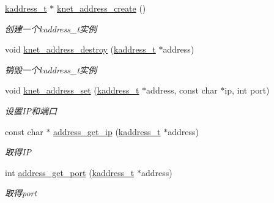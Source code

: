 \begin{DoxyCompactItemize}
\item 
\hyperlink{a00054_a44e99fab0348ec54cfee119ddd9ceed6_a44e99fab0348ec54cfee119ddd9ceed6}{kaddress\+\_\+t} $\ast$ \hyperlink{a00042_a1a1e0dffc03ea50995d5db10e17865f5_a1a1e0dffc03ea50995d5db10e17865f5}{knet\+\_\+address\+\_\+create} ()
\begin{DoxyCompactList}\small\item\em 创建一个kaddress\+\_\+t实例 \end{DoxyCompactList}\item 
void \hyperlink{a00042_a6d8753e0c57b30294243ee26881e7650_a6d8753e0c57b30294243ee26881e7650}{knet\+\_\+address\+\_\+destroy} (\hyperlink{a00054_a44e99fab0348ec54cfee119ddd9ceed6_a44e99fab0348ec54cfee119ddd9ceed6}{kaddress\+\_\+t} $\ast$address)
\begin{DoxyCompactList}\small\item\em 销毁一个kaddress\+\_\+t实例 \end{DoxyCompactList}\item 
void \hyperlink{a00042_a929d17892b34acdbdbc1ff8e8d0f9c71_a929d17892b34acdbdbc1ff8e8d0f9c71}{knet\+\_\+address\+\_\+set} (\hyperlink{a00054_a44e99fab0348ec54cfee119ddd9ceed6_a44e99fab0348ec54cfee119ddd9ceed6}{kaddress\+\_\+t} $\ast$address, const char $\ast$ip, int port)
\begin{DoxyCompactList}\small\item\em 设置\+I\+P和端口 \end{DoxyCompactList}\item 
const char $\ast$ \hyperlink{a00107_gaa1ea22192168bb6baea88feeb20eb601_gaa1ea22192168bb6baea88feeb20eb601}{address\+\_\+get\+\_\+ip} (\hyperlink{a00054_a44e99fab0348ec54cfee119ddd9ceed6_a44e99fab0348ec54cfee119ddd9ceed6}{kaddress\+\_\+t} $\ast$address)
\begin{DoxyCompactList}\small\item\em 取得\+I\+P \end{DoxyCompactList}\item 
int \hyperlink{a00107_ga9acaa00fe11bcecadea350baf9da7172_ga9acaa00fe11bcecadea350baf9da7172}{address\+\_\+get\+\_\+port} (\hyperlink{a00054_a44e99fab0348ec54cfee119ddd9ceed6_a44e99fab0348ec54cfee119ddd9ceed6}{kaddress\+\_\+t} $\ast$address)
\begin{DoxyCompactList}\small\item\em 取得port \end{DoxyCompactList}\end{DoxyCompactItemize}


